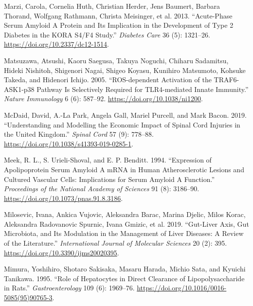 \documentclass[9pt,lineno]{elife}
\newlength{\cslhangindent}
\newlength{\cslentryspacingunit} %
\newenvironment{CSLReferences}[2] %
 {%
  \setlength{\parindent}{0pt}
  \ifodd #1
  \let\oldpar\par
  \def\par{\hangindent=\cslhangindent\oldpar}
  \fi
  \setlength{\parskip}{#2\cslentryspacingunit}
 }%
 {}
\begin{document}
\begin{landscape}
\begin{landscape}
\begin{landscape}
\begin{landscape}
\begin{CSLReferences}{1}{0}
\leavevmode{}%
Marzi, Carola, Cornelia Huth, Christian Herder, Jens Baumert, Barbara Thorand, Wolfgang Rathmann, Christa Meisinger, et al. 2013. {``Acute-{Phase Serum Amyloid A Protein} and {Its Implication} in the {Development} of {Type} 2 {Diabetes} in the {KORA S4}/{F4 Study}.''} \emph{Diabetes Care} 36 (5): 1321--26. \url{https://doi.org/10.2337/dc12-1514}.

\leavevmode{}%
Matsuzawa, Atsushi, Kaoru Saegusa, Takuya Noguchi, Chiharu Sadamitsu, Hideki Nishitoh, Shigenori Nagai, Shigeo Koyasu, Kunihiro Matsumoto, Kohsuke Takeda, and Hidenori Ichijo. 2005. {``{ROS-dependent} Activation of the {TRAF6-ASK1-p38} Pathway Is Selectively Required for {TLR4-mediated} Innate Immunity.''} \emph{Nature Immunology} 6 (6): 587--92. \url{https://doi.org/10.1038/ni1200}.

\leavevmode{}%
McDaid, David, A.-La Park, Angela Gall, Mariel Purcell, and Mark Bacon. 2019. {``Understanding and Modelling the Economic Impact of Spinal Cord Injuries in the {United Kingdom}.''} \emph{Spinal Cord} 57 (9): 778--88. \url{https://doi.org/10.1038/s41393-019-0285-1}.

\leavevmode{}%
Meek, R. L., S. Urieli-Shoval, and E. P. Benditt. 1994. {``Expression of Apolipoprotein Serum Amyloid {A mRNA} in Human Atherosclerotic Lesions and Cultured Vascular Cells: Implications for Serum Amyloid {A} Function.''} \emph{Proceedings of the National Academy of Sciences} 91 (8): 3186--90. \url{https://doi.org/10.1073/pnas.91.8.3186}.

\leavevmode{}%
Milosevic, Ivana, Ankica Vujovic, Aleksandra Barac, Marina Djelic, Milos Korac, Aleksandra Radovanovic Spurnic, Ivana Gmizic, et al. 2019. {``Gut-{Liver Axis}, {Gut Microbiota}, and {Its Modulation} in the {Management} of {Liver Diseases}: {A Review} of the {Literature}.''} \emph{International Journal of Molecular Sciences} 20 (2): 395. \url{https://doi.org/10.3390/ijms20020395}.

\leavevmode{}%
Mimura, Yoshihiro, Shotaro Sakisaka, Masaru Harada, Michio Sata, and Kyuichi Tanikawa. 1995. {``Role of Hepatocytes in Direct Clearance of Lipopolysaccharide in Rats.''} \emph{Gastroenterology} 109 (6): 1969--76. \url{https://doi.org/10.1016/0016-5085(95)90765-3}.


\end{CSLReferences}
\end{landscape}
\end{landscape}
\end{landscape}
\end{landscape}
\end{document}
